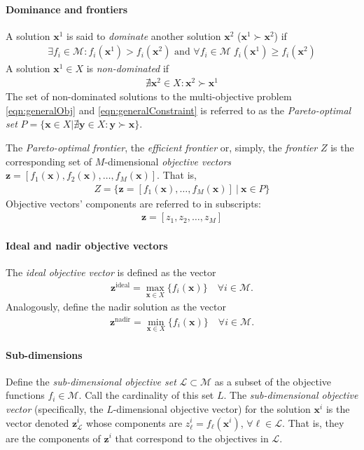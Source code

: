 \paragraph{Dominance and frontiers}
A solution $\mathbf{x}^1$ is said to \textit{dominate} another solution $\mathbf{x}^2$ ($\mathbf{x}^1 \succ \mathbf{x}^2$) if
\begin{align}
\exists f_i \in \mathcal{M} : f_i(\mathbf{x}^1) > f_i(\mathbf{x}^2) \text{ and } \forall f_i \in \mathcal{M} \; f_i(\mathbf{x}^1) \ge f_i(\mathbf{x}^2)
\end{align}
A solution $\mathbf{x}^1 \in X$ is \textit{non-dominated} if
\begin{align}
\nexists \mathbf{x}^2 \in X : \mathbf{x}^2 \succ \mathbf{x}^1
\end{align}
The set of non-dominated solutions to the multi-objective problem \eqref{eqn:generalObj} and \eqref{eqn:generalConstraint} is referred to as the \textit{Pareto-optimal set} $P = \{\mathbf{x} \in X | \nexists \mathbf{y} \in X : \mathbf{y} \succ \mathbf{x} \}$.

The \textit{Pareto-optimal frontier}, the \textit{efficient frontier} or, simply, the \textit{frontier} $Z$ is the corresponding set of $M$-dimensional \textit{objective vectors} $\mathbf{z} = [f_1(\mathbf{x}),f_2(\mathbf{x}),\ldots,f_M(\mathbf{x})]$. That is,
\begin{align}
Z = \{\mathbf{z} = [f_1(\mathbf{x}),\ldots,f_M(\mathbf{x})] \:|\: \mathbf{x} \in P\}
\end{align}
Objective vectors' components are referred to in subscripts:
\begin{align}
\mathbf{z} = [z_1, z_2, \ldots, z_M]
\end{align}

\paragraph{Ideal and nadir objective vectors}
The \textit{ideal objective vector} is defined as the vector
\begin{align}
\mathbf{z}^{\text{ideal}} = \max_{\mathbf{x} \in X}\{f_i(\mathbf{x})\} \quad \forall i \in \mathcal{M}.
\end{align}
Analogously, define the nadir solution as the vector
\begin{align}
\mathbf{z}^{\text{nadir}} = \min_{\mathbf{x} \in X}\{f_i(\mathbf{x})\} \quad \forall i \in \mathcal{M}.
\end{align}


\paragraph{Sub-dimensions}
Define the \textit{sub-dimensional objective set} $\mathcal{L} \subset \mathcal{M}$ as a subset of the objective functions $f_i \in \mathcal{M}$. Call the cardinality of this set $L$. The \textit{sub-dimensional objective vector} (specifically, the $L$-dimensional objective vector) for the solution $\mathbf{x}^i$ is the vector denoted $\mathbf{z}^i_\mathcal{L}$ whose components are $z^i_\ell = f_\ell(\mathbf{x}^i)$, $\forall \ell \in \mathcal{L}$. That is, they are the components of $\mathbf{z}^i$ that correspond to the objectives in $\mathcal{L}$.

